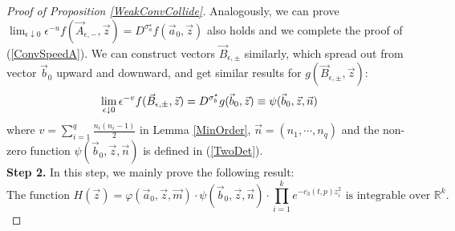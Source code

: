\begin{proof}[Proof of Proposition \ref{WeakConvCollide}]
Analogously, we can prove $\lim_{\epsilon\downarrow 0}\epsilon^{-u}f(\vec{A}_{\epsilon,-},\vec{z})=D^{\sigma_{a}^{\star}}f(\vec{a}_0,\vec{z})$ also holds and we complete the proof of (\ref{ConvSpeedA}). We can construct vectors $\vec{B}_{\epsilon,\pm}$ similarly, which spread out from vector $\vec{b}_{0}$ upward and downward, and get similar results for $g(\vec{B}_{\epsilon,\pm},\vec{z})$:
\begin{equation}{\label{ConvSpeedB}}
		\lim_{\epsilon\downarrow 0}\epsilon^{-v}f(\vec{B}_{\epsilon,\pm},\vec{z})=D^{\sigma_{b}^{\star}}g(\vec{b}_{0},\vec{z})\equiv\psi(\vec{b}_{0},\vec{z},\vec{n})
\end{equation}
where $v=\sum_{i=1}^{q}\frac{n_{i}(n_{i}-1)}{2}$ in Lemma \ref{MinOrder}, $\vec{n}=(n_{1},\cdots,n_{q})$ and the non-zero function $\psi(\vec{b}_{0},\vec{z},\vec{n})$ is defined in (\ref{TwoDet}).\\
\textbf{Step 2. }In this step, we mainly prove the following result:
\begin{equation}
	\text{The function } H(\vec{z})=\varphi(\vec{a}_{0},\vec{z},\vec{m})\cdot\psi(\vec{b}_{0},\vec{z},\vec{n})\cdot\prod_{i=1}^{k}e^{-c_{3}(t,p)z_{i}^{2}}\text{ is integrable over } \mathbb{R}^{k}.
\end{equation}


\end{proof}

